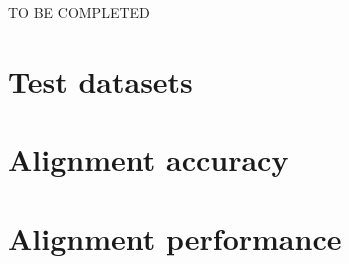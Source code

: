 \documentclass[../main.tex]{subfiles}
\begin{document}
TO BE COMPLETED

\section{Test datasets}


\section{Alignment accuracy}


\section{Alignment performance}

\end{document}
